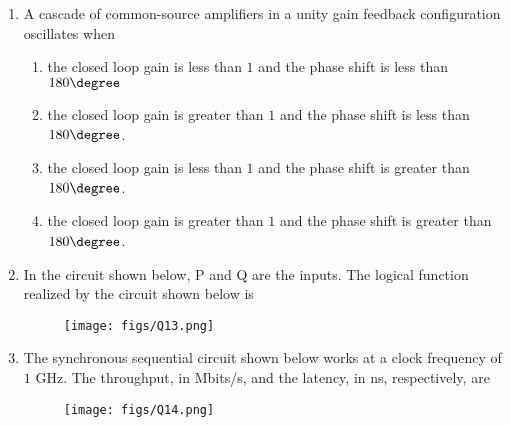 \documentclass[a4paper, 11pt]{article}
\begin{document}
\begin{enumerate}
    \hfill{}
    
    \item A cascade of common-source amplifiers in a unity gain feedback configuration oscillates when
    \begin{enumerate}
        \item the closed loop gain is less than $1$ and the phase shift is less than $180\degree$
        \item the closed loop gain is greater than $1$ and the phase shift is less than $180\degree$.
        \item the closed loop gain is less than $1$ and the phase shift is greater than $180\degree$.
        \item the closed loop gain is greater than $1$ and the phase shift is greater than $180\degree$.
    \end{enumerate}

    \hfill{}
    
    \item In the circuit shown below, P and Q are the inputs. The logical function realized by the circuit shown below is
    \begin{figure}[H]
        \centering
        \texttt{[image: figs/Q13.png]}
        \caption*{}
        \label{fig:q23}
    \end{figure}
    \begin{enumerate}
    \end{enumerate}

    \hfill{}
    
    \item The synchronous sequential circuit shown below works at a clock frequency of $1$ GHz. The throughput, in Mbits/s, and the latency, in ns, respectively, are
    \begin{figure}[H]
        \centering
        \texttt{[image: figs/Q14.png]}
        \caption*{}
        \label{fig:q24}
    \end{figure}
    \begin{enumerate}
    \end{enumerate}
    

\end{enumerate}
\end{document}
